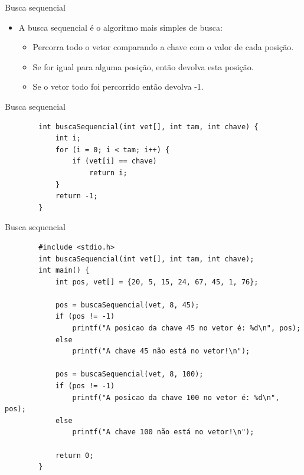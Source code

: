 \documentclass[handout]{beamer}
\begin{document}
\begin{frame}[fragile]{Busca sequencial}

    \begin{itemize}
        \item A busca sequencial é o algoritmo mais simples de busca:
        \begin{itemize}
            \item Percorra todo o vetor comparando a chave com o valor de cada posição.
            \item Se for igual para alguma posição, então devolva esta posição.
            \item Se o vetor todo foi percorrido então devolva -1.
        \end{itemize}
    \end{itemize}

\end{frame}

\begin{frame}[fragile]{Busca sequencial}

    \begin{verbatim}
        int buscaSequencial(int vet[], int tam, int chave) {
            int i;
            for (i = 0; i < tam; i++) {
                if (vet[i] == chave)
                    return i;
            }
            return -1;
        }
    \end{verbatim}

\end{frame}

\begin{frame}[fragile]{Busca sequencial}

    \vspace{-1em}
    \begin{verbatim}
        #include <stdio.h>
        int buscaSequencial(int vet[], int tam, int chave);
        int main() {
            int pos, vet[] = {20, 5, 15, 24, 67, 45, 1, 76};
            
            pos = buscaSequencial(vet, 8, 45);
            if (pos != -1)
                printf("A posicao da chave 45 no vetor é: %d\n", pos);
            else
                printf("A chave 45 não está no vetor!\n");

            pos = buscaSequencial(vet, 8, 100);
            if (pos != -1)
                printf("A posicao da chave 100 no vetor é: %d\n", pos);
            else
                printf("A chave 100 não está no vetor!\n");

            return 0;
        }
    \end{verbatim} 

\end{frame}
\end{document}
